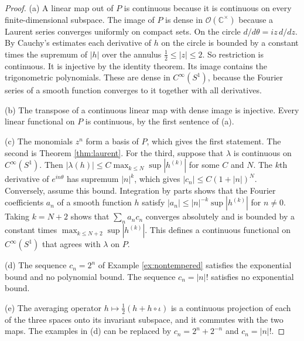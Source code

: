 \begin{proof}
(a) A linear map out of $P$ is continuous because it is continuous on every finite-dimensional subspace. The image of $P$ is dense in $\mathcal O(\mathbb C^\times)$ because a Laurent series converges uniformly on compact sets. On the circle $d/d\theta=iz\,d/dz$. By Cauchy's estimates each derivative of $h$ on the circle is bounded by a constant times the supremum of $|h|$ over the annulus $\tfrac12\le|z|\le2$. So restriction is continuous. It is injective by the identity theorem. Its image contains the trigonometric polynomials. These are dense in $C^\infty(S^1)$, because the Fourier series of a smooth function converges to it together with all derivatives.

(b) The transpose of a continuous linear map with dense image is injective. Every linear functional on $P$ is continuous, by the first sentence of (a).

(c) The monomials $z^n$ form a basis of $P$, which gives the first statement. The second is Theorem \ref{thm:laurent}. For the third, suppose that $\lambda$ is continuous on $C^\infty(S^1)$. Then $|\lambda(h)|\le C\max_{k\le N}\sup|h^{(k)}|$ for some $C$ and $N$. The $k$th derivative of $e^{in\theta}$ has supremum $|n|^k$, which gives $|c_n|\le C(1+|n|)^N$. Conversely, assume this bound. Integration by parts shows that the Fourier coefficients $a_n$ of a smooth function $h$ satisfy $|a_n|\le|n|^{-k}\sup|h^{(k)}|$ for $n\ne0$. Taking $k=N+2$ shows that $\sum_na_nc_n$ converges absolutely and is bounded by a constant times $\max_{k\le N+2}\sup|h^{(k)}|$. This defines a continuous functional on $C^\infty(S^1)$ that agrees with $\lambda$ on $P$.

(d) The sequence $c_n=2^n$ of Example \ref{ex:nontempered} satisfies the exponential bound and no polynomial bound. The sequence $c_n=|n|!$ satisfies no exponential bound.

(e) The averaging operator $h\mapsto\tfrac12(h+h\circ\iota)$ is a continuous projection of each of the three spaces onto its invariant subspace, and it commutes with the two maps. The examples in (d) can be replaced by $c_n=2^n+2^{-n}$ and $c_n=|n|!$.
\end{proof}

